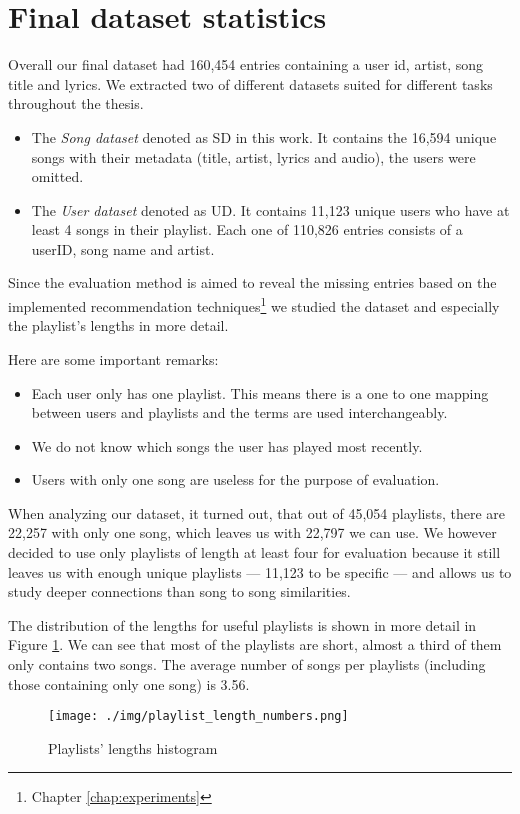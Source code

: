 \section{Final dataset statistics}
Overall our final dataset had 160,454 entries containing a user id, artist, song title and lyrics. We extracted two of different datasets suited for different tasks throughout the thesis.
\begin{itemize}
    \item The \textit{Song dataset} denoted as SD in this work. It contains the
    16,594 unique songs with their metadata (title, artist, lyrics and audio), the users were omitted.
    \item The \textit{User dataset} denoted as UD. It contains 11,123 unique users who have at least 4 songs in their playlist. Each one of 110,826 entries consists of a userID, song name and artist. 
\end{itemize}
 Since the evaluation method is aimed to reveal the missing entries based on the
 implemented recommendation techniques\footnote{Chapter \ref{chap:experiments}} we studied the dataset and especially the playlist's
 lengths in more detail.
 
Here are some important remarks:
\begin{itemize}
    \item Each user only has one playlist. This means there is a one to one mapping between users and playlists and the terms are used interchangeably.
    \item We do not know which songs the user has played most recently.
    \item Users with only one song are useless for the purpose of evaluation.
\end{itemize} 
When analyzing our dataset, it turned out, that out of 45,054 playlists, there are 22,257 with only one song, which leaves us with 22,797 we can use. We however decided to use only playlists of length at least four for evaluation because it still leaves us with enough unique playlists --- 11,123 to be specific --- and allows us to study deeper connections than song to song similarities. 

The distribution of the lengths for useful playlists is shown in more detail in Figure
\ref{fig:playlist_length_distribution}. We can see that most of the playlists are
short, almost a third of them only contains two songs. The average number of songs
per playlists (including those containing only one song) is 3.56. 
\begin{figure}[]
    \centering
	\texttt{[image: ./img/playlist\_length\_numbers.png]}
	\caption{Playlists' lengths histogram}
	\label{fig:playlist_length_distribution}
\end{figure}

